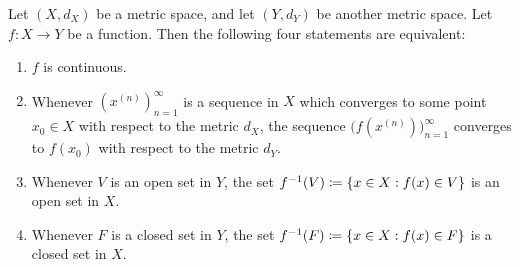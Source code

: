 \begin{thm}\label{ii:2.1.5}
  Let \((X, d_X)\) be a metric space, and let \((Y, d_Y)\) be another metric space.
  Let \(f : X \to Y\) be a function.
  Then the following four statements are equivalent:
  \begin{enumerate}
    \item \(f\) is continuous.
    \item Whenever \((x^{(n)})_{n = 1}^\infty\) is a sequence in \(X\) which converges to some point \(x_0 \in X\) with respect to the metric \(d_X\), the sequence \(\big(f(x^{(n)})\big)_{n = 1}^\infty\) converges to \(f(x_0)\) with respect to the metric \(d_Y\).
    \item Whenever \(V\) is an open set in \(Y\), the set \(f^{-1}(V) \coloneqq \left\lbrace x \in X : f(x) \in V\right\rbrace\) is an open set in \(X\).
    \item Whenever \(F\) is a closed set in \(Y\), the set \(f^{-1}(F) \coloneqq \left\lbrace x \in X : f(x) \in F\right\rbrace\) is a closed set in \(X\).
  \end{enumerate}
\end{thm}

